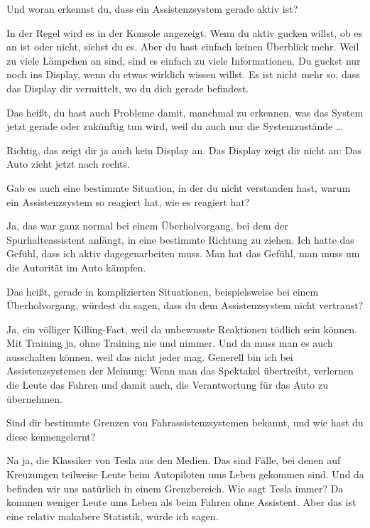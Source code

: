 \interviewerin
Und woran erkennst du, dass ein Assistenzsystem gerade aktiv ist?

In der Regel wird es in der Konsole angezeigt. Wenn du aktiv gucken
willst, ob es an ist oder nicht, siehst du es. Aber du hast einfach
keinen Überblick mehr. Weil zu viele Lämpchen an sind, sind es einfach
zu viele Informationen. Du guckst nur noch ins Display, wenn du etwas
wirklich wissen willst. Es ist nicht mehr so, dass das Display dir
vermittelt, wo du dich gerade befindest.

\interviewerin
Das heißt, du hast auch Probleme damit, manchmal zu erkennen, was das
System jetzt gerade oder zukünftig tun wird, weil du auch nur die
Systemzustände …

Richtig, das zeigt dir ja auch kein Display an. Das Display zeigt dir
nicht an: Das Auto zieht jetzt nach rechts.

\interviewerin
Gab es auch eine bestimmte Situation, in der du nicht verstanden hast,
warum ein Assistenzsystem so reagiert hat, wie es reagiert hat?

Ja, das war ganz normal bei einem Überholvorgang, bei dem der
Spurhalteassistent anfängt, in eine bestimmte Richtung zu ziehen. Ich
hatte das Gefühl, dass ich aktiv dagegenarbeiten muss. Man hat das
Gefühl, man muss um die Autorität im Auto kämpfen.

\interviewerin
Das heißt, gerade in komplizierten Situationen, beispielsweise bei
einem Überholvorgang, würdest du sagen, dass du dem Assistenzsystem
nicht vertraust?

Ja, ein völliger Killing-Fact, weil da unbewusste Reaktionen tödlich
sein können. Mit Training ja, ohne Training nie und nimmer. Und da muss
man es auch ausschalten können, weil das nicht jeder mag. Generell bin
ich bei Assistenzsystemen der Meinung: Wenn man das Spektakel übertreibt,
verlernen die Leute das Fahren und damit auch, die Verantwortung für
das Auto zu übernehmen.

\interviewerin
Sind dir bestimmte Grenzen von Fahrassistenzsystemen bekannt, und wie
hast du diese kennengelernt?

Na ja, die Klassiker von Tesla aus den Medien. Das sind Fälle, bei denen
auf Kreuzungen teilweise Leute beim Autopiloten ums Leben gekommen
sind. Und da befinden wir uns natürlich in einem Grenzbereich. Wie sagt
Tesla immer? Da kommen weniger Leute ums Leben als beim Fahren ohne
Assistent. Aber das ist eine relativ makabere Statistik, würde ich
sagen.

